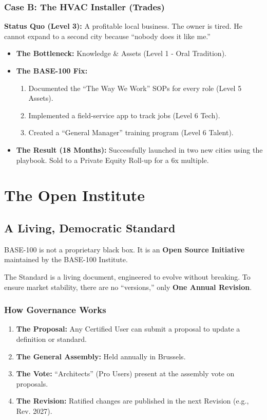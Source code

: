 \documentclass[11pt, a4paper, oneside]{report}
\begin{document}
\subsection*{Case B: The HVAC Installer (Trades)}
\textbf{Status Quo (Level 3):} A profitable local business. The owner is tired. He cannot expand to a second city because ``nobody does it like me.''
\begin{itemize}
    \item \textbf{The Bottleneck:} Knowledge \& Assets (Level 1 - Oral Tradition).
    \item \textbf{The BASE-100 Fix:}
    \begin{enumerate}
        \item Documented the ``The Way We Work'' SOPs for every role (Level 5 Assets).
        \item Implemented a field-service app to track jobs (Level 6 Tech).
        \item Created a ``General Manager'' training program (Level 6 Talent).
    \end{enumerate}
    \item \textbf{The Result (18 Months):} Successfully launched in two new cities using the playbook. Sold to a Private Equity Roll-up for a 6x multiple.
\end{itemize}

\chapter{The Open Institute}
\section*{A Living, Democratic Standard}

BASE-100 is not a proprietary black box. It is an \textbf{Open Source Initiative} maintained by the BASE-100 Institute.

The Standard is a living document, engineered to evolve without breaking. To ensure market stability, there are no ``versions,'' only \textbf{One Annual Revision}.

\subsection*{How Governance Works}
\begin{enumerate}
    \item \textbf{The Proposal:} Any Certified User can submit a proposal to update a definition or standard.
    \item \textbf{The General Assembly:} Held annually in Brussels.
    \item \textbf{The Vote:} ``Architects'' (Pro Users) present at the assembly vote on proposals.
    \item \textbf{The Revision:} Ratified changes are published in the next Revision (e.g., Rev. 2027).
\end{enumerate}
\end{document}
